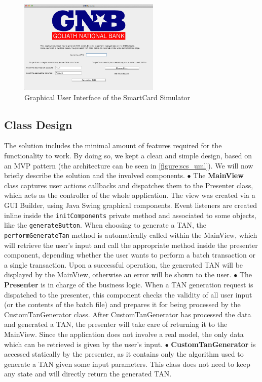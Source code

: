 \begin{figure}[h!tbp]
	\centering
	\includegraphics[width=0.6\textwidth]{figures/scs_gui}
	\caption{Graphical User Interface of the SmartCard Simulator}
	\label{figure:scs_gui}
\end{figure}

\subsection{Class Design}
The solution includes the minimal amount of features required for the functionality to work. By doing so, we kept a clean and simple design, based on an MVP pattern (the architecture can be seen in \autoref{figure:scs_uml}). We will now briefly describe the solution and the involved components.\newline
$\bullet$ The \textbf{MainView} class captures user actions callbacks and dispatches them to the Presenter class, which acts as the controller of the whole application. The view was created via a GUI Builder, using Java Swing graphical components.\newline
Event listeners are created inline inside the \texttt{initComponents} private method and associated to some objects, like the \texttt{generateButton}. When choosing to generate a TAN, the \texttt{performGenerateTan} method is automatically called within the MainView, which will retrieve the user's input and call the appropriate method inside the presenter component, depending whether the user wants to perform a batch transaction or a single transaction.\newline
Upon a successful operation, the generated TAN will be displayed by the MainView, otherwise an error will be shown to the user.\newline
$\bullet$ The \textbf{Presenter} is in charge of the business logic. When a TAN generation request is dispatched to the presenter, this component checks the validity of all user input (or the contents of the batch file) and prepares it for being processed by the CustomTanGenerator class. After CustomTanGenerator has processed the data and generated a TAN, the presenter will take care of returning it to the MainView.
Since the application does not involve a real model, the only data which can be retrieved is given by the user's input.\newline
$\bullet$ \textbf{CustomTanGenerator} is accessed statically by the presenter, as it contains only the algorithm used to generate a TAN given some input parameters. This class does not need to keep any state and will directly return the generated TAN.


